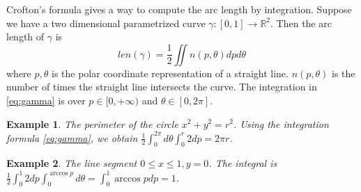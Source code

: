 \documentclass{article}
\newtheorem{example}{Example}
\begin{document}
Crofton's formula gives a way to compute the arc length
by integration. Suppose we have a two dimensional
parametrized curve $\gamma: [0, 1] \to \mathbb{R}^2$.
Then the arc length of $\gamma$ is
\begin{equation}\label{eq:gamma}
    len(\gamma) = \frac{1}{2}\iint n(p, \theta)
    dp d\theta
\end{equation}
where $p, \theta$ is the polar coordinate representation
of a straight line. $n(p, \theta)$ is the number of times the 
straight line intersects the curve. The integration
in \eqref{eq:gamma} is over $p\in [0, +\infty)$
and $\theta \in [0, 2\pi]$.
\begin{example}
    The perimeter of the circle $x^2+y^2=r^2$.
    Using the integration formula \eqref{eq:gamma},
    we obtain $\frac{1}{2}\int_{0}^{2\pi} d\theta \int_0^r 2 dp=2\pi r$.
\end{example}
\begin{example}
    The line segment $0\leq x \leq 1, y=0$.
    The integral is $\frac{1}{2}\int_0^1 2 dp
    \int_0^{\arccos p} d\theta =
    \int_0^1 \arccos p dp=1$.
\end{example}


\end{document}
